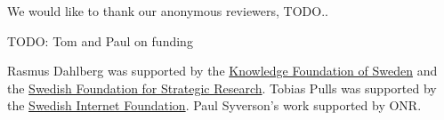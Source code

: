 We would like to thank our anonymous reviewers, TODO..

TODO: Tom and Paul on funding

Rasmus Dahlberg was supported by the \href{www.kks.se}{Knowledge Foundation of
Sweden} and the \href{https://strategiska.se/en/}{Swedish Foundation for
Strategic Research}. Tobias Pulls was supported by the
\href{https://internetstiftelsen.se/en/}{Swedish Internet Foundation}.
Paul Syverson's work supported by ONR\@.